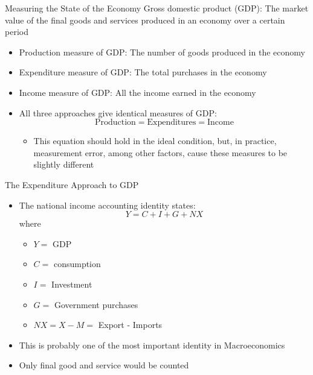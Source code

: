 \documentclass[aspectratio=1610]{beamer}
\begin{document}
\begin{frame}[wide]{Measuring the State of the Economy}
	Gross domestic product (GDP): The market value of the final goods and services produced in an economy over a certain period
	\vspace{2mm}
	\begin{itemize}
		\item Production measure of GDP: The number of goods produced in the economy
		\item Expenditure measure of GDP: The total purchases in the economy
		\item Income measure of GDP: All the income earned in the economy
		\item All three approaches give identical measures of GDP:
		\[\mbox{Production} = \mbox{Expenditures} = \mbox{Income}\]
		\begin{itemize}
			\item This equation should hold in the ideal condition, but, in practice, measurement error, among other factors, cause these measures to be slightly different
		\end{itemize}
	\end{itemize}
\end{frame}

\begin{frame}[wide]{The Expenditure Approach to GDP}
	\begin{itemize}
		\item The national income accounting identity states: 
		\[Y= C+I+G+NX\]
		where
		\begin{itemize}[]
			\item $Y=$ GDP
			\item $C=$ consumption
			\item $I=$ Investment
			\item $G=$ Government purchases
			\item $NX=X-M=$ Export - Imports
		\end{itemize}
		\item This is probably one of the most important identity in Macroeconomics
		\item Only final good and service would be counted
	\end{itemize}
\end{frame}
\end{document}
